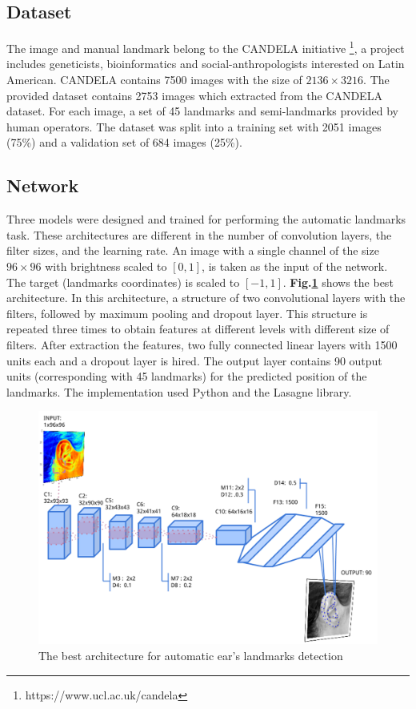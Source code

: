 \documentclass[12pt,a4paper]{article}
\begin{document}
\subsection{Dataset}
The image and manual landmark belong to the CANDELA initiative \footnote{https://www.ucl.ac.uk/candela}, a project includes geneticists, bioinformatics and social-anthropologists interested on Latin American. CANDELA contains 7500 images with the size of $2136 \times 3216$. The provided dataset contains 2753 images which extracted from the CANDELA dataset. For each image, a set of 45 landmarks and semi-landmarks provided by human operators. The dataset was split into a training set with 2051 images (75\%) and a validation set of 684 images (25\%).
\subsection{Network}
Three models were designed and trained for performing the automatic landmarks task. These architectures are different in the number of convolution layers, the filter sizes, and the learning rate. An image with a single channel of the size  $96 \times 96$ with brightness scaled to $[0,1]$, is taken as the input of the network. The target (landmarks coordinates) is scaled to $[-1,1]$. \textbf{Fig.\ref{1Econv}} shows the best architecture. In this architecture, a structure of two convolutional layers with the filters, followed by maximum pooling and dropout layer. This structure is repeated three times to obtain features at different levels with different size of filters. After extraction the features, two fully connected linear layers with 1500 units each and a dropout layer is hired. The output layer contains 90 output units (corresponding with 45 landmarks) for the predicted position of the landmarks. The implementation used Python and the Lasagne library\cite{lasagne}.
\begin{figure}[h!]
	\centering
	\includegraphics[scale=0.4]{images/ear_cnn}
	\caption{The best architecture for automatic ear's landmarks detection}
	\label{1Econv}
\end{figure}
\end{document}
